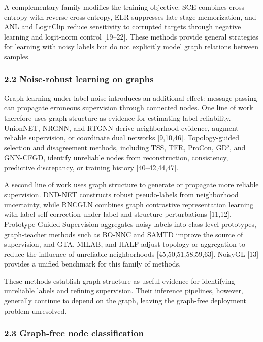 A complementary family modifies the training objective. SCE combines cross-entropy with reverse cross-entropy, ELR suppresses late-stage memorization, and ANL and LogitClip reduce sensitivity to corrupted targets through negative learning and logit-norm control {[}19--22{]}. These methods provide general strategies for learning with noisy labels but do not explicitly model graph relations between samples.

\subsubsection{2.2 Noise-robust learning on graphs}\label{noise-robust-learning-on-graphs}

Graph learning under label noise introduces an additional effect: message passing can propagate erroneous supervision through connected nodes. One line of work therefore uses graph structure as evidence for estimating label reliability. UnionNET, NRGNN, and RTGNN derive neighborhood evidence, augment reliable supervision, or coordinate dual networks {[}9,10,46{]}. Topology-guided selection and disagreement methods, including TSS, TFR, ProCon, GD², and GNN-CFGD, identify unreliable nodes from reconstruction, consistency, predictive discrepancy, or training history {[}40--42,44,47{]}.

A second line of work uses graph structure to generate or propagate more reliable supervision. DND-NET constructs robust pseudo-labels from neighborhood uncertainty, while RNCGLN combines graph contrastive representation learning with label self-correction under label and structure perturbations {[}11,12{]}. Prototype-Guided Supervision aggregates noisy labels into class-level prototypes, graph-teacher methods such as BO-NNC and SAMTD improve the source of supervision, and GTA, MILAB, and HALF adjust topology or aggregation to reduce the influence of unreliable neighborhoods {[}45,50,51,58,59,63{]}. NoisyGL {[}13{]} provides a unified benchmark for this family of methods.

These methods establish graph structure as useful evidence for identifying unreliable labels and refining supervision. Their inference pipelines, however, generally continue to depend on the graph, leaving the graph-free deployment problem unresolved.

\subsubsection{2.3 Graph-free node classification}\label{graph-free-node-classification}


